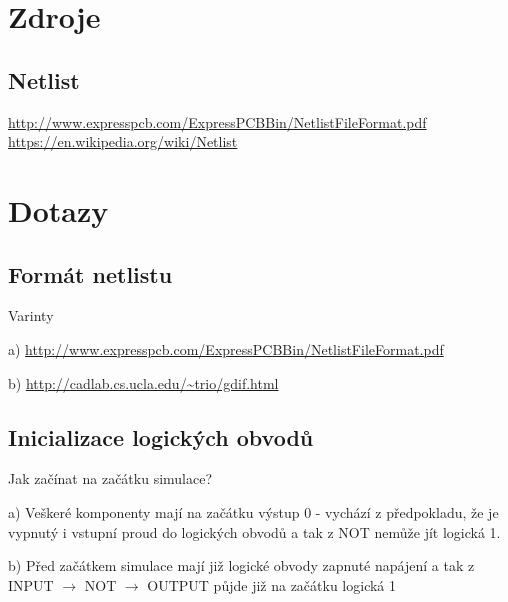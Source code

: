 \documentclass[11pt,a4paper]{article}
\author{Stanislav Nechutný}
\begin{document}
	\section{Zdroje}

		\subsection{Netlist}


			\url{http://www.expresspcb.com/ExpressPCBBin/NetlistFileFormat.pdf} \\
			\url{https://en.wikipedia.org/wiki/Netlist}

	\section{Dotazy}

		\subsection{Formát netlistu}

			Varinty

				a) \url{http://www.expresspcb.com/ExpressPCBBin/NetlistFileFormat.pdf}

				b) \url{http://cadlab.cs.ucla.edu/~trio/gdif.html}

		\subsection{Inicializace logických obvodů}

			Jak začínat na začátku simulace?

				a) Veškeré komponenty mají na začátku výstup 0 - vychází z předpokladu, že je vypnutý i vstupní proud do logických obvodů a tak z NOT nemůže jít logická 1.

				b) Před začátkem simulace mají již logické obvody zapnuté napájení a tak z INPUT $\rightarrow$ NOT $\rightarrow$ OUTPUT půjde již na začátku logická 1
\end{document}

